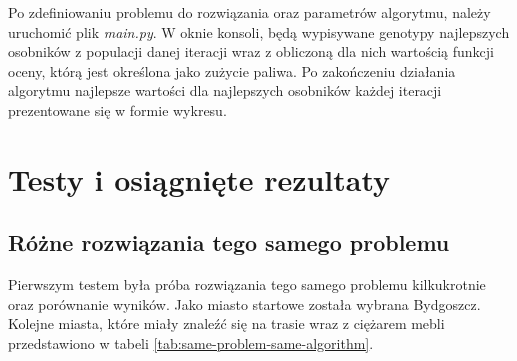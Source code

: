 \documentclass[12pt, oneside, final]{report}
\begin{document}
Po zdefiniowaniu problemu do rozwiązania oraz parametrów algorytmu, należy uruchomić plik \textit{main.py}. W oknie konsoli, będą wypisywane genotypy najlepszych osobników z populacji danej iteracji wraz z obliczoną dla nich wartością funkcji oceny, którą jest określona jako zużycie paliwa. %
 Po zakończeniu działania algorytmu najlepsze wartości dla najlepszych osobników każdej iteracji prezentowane się w formie wykresu.

\chapter{Testy i osiągnięte rezultaty}

\section{Różne rozwiązania tego samego problemu}
Pierwszym testem była próba rozwiązania tego samego problemu kilkukrotnie oraz porównanie wyników. Jako miasto startowe została wybrana Bydgoszcz. Kolejne miasta, które miały znaleźć się na trasie wraz z ciężarem mebli przedstawiono w tabeli \ref{tab:same-problem-same-algorithm}.

\begin{table}[ht!]
\caption{Definicja problemu do rozwiązania w pierwszym teście}
\label{tab:same-problem-same-algorithm}
\centering
{}
\end{table}
\end{document}
